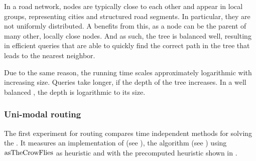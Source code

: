 	In a road network, nodes are typically close to each other and appear in local groups, representing cities and structured
	road segments. In particular, they are not uniformly distributed. A \coverTree benefits from this, as a node can be the
	parent of many other, locally close nodes. And as such, the tree is balanced well, resulting in efficient queries
	that are able to quickly find the correct path in the tree that leads to the nearest neighbor.
	
	Due to the same reason, the running time scales approximately logarithmic with increasing size. Queries take longer, if the
	depth of the tree increases. In a well balanced \coverTree, the depth is logarithmic to its size.

\subsubsection{Uni-modal routing}
	The first experiment for \uniModal routing compares time independent methods for solving the \shortestPathProblem.
	It measures an implementation of \dijkstra (see ), the \astar algorithm (see )
	using $\operatorname{asTheCrowFlies}$ as heuristic and \alt with the precomputed heuristic shown in .
	
